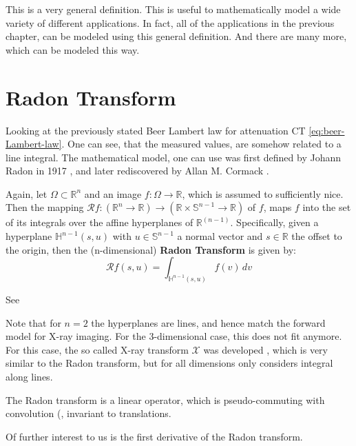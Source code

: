 This is a very general definition. This is useful to mathematically model a wide variety of
different applications. In fact, all of the applications in the previous chapter, can be modeled
using this general definition. And there are many more, which can be modeled this way.

\section{Radon Transform}

Looking at the previously stated Beer Lambert law for attenuation CT \autoref{eq:beer-Lambert-law}.
One can see, that the measured values, are somehow related to a line integral. The mathematical
model, one can use was first defined by Johann Radon in 1917 , and
later rediscovered by Allan M. Cormack .

\begin{definition}
	Again, let \(\Omega \subset \mathbb{R}^n\) and an image \(f\colon \Omega \to \mathbb{R}\),
	which is assumed to sufficiently nice. Then the mapping \(\mathscr{R}f\colon (\mathbb{R}^n
	\to \mathbb{R}) \to (\mathbb{R} \times \mathbb{S}^{n-1} \to \mathbb{R})\) of \(f\), maps
	\(f\) into the set of its integrals over the affine hyperplanes of \(\mathbb{R}^(n-1)\).
	Specifically, given a hyperplane \(\mathbb{H}^{n-1}(s, u)\) with \(u \in \mathbb{S}^{n-1}\)
	a normal vector and \(s \in \mathbb{R}\) the offset to the origin, then the (n-dimensional)
	\textbf{Radon Transform} is given by:
	\[ \mathscr{R}f(s, u) = \int_{\mathbb{H}^{n-1}(s, u)} f(v) \, dv \]

	See 
\end{definition}

Note that for \(n=2\) the hyperplanes are lines, and hence match the forward model for X-ray
imaging. For the 3-dimensional case, this does not fit anymore. For this case, the so called
X-ray transform \(\mathscr{X}\) was developed , which is
very similar to the Radon transform, but for all dimensions only considers integral along lines.

The Radon transform is a linear operator, which is pseudo-commuting with convolution (, invariant to
translations.  

Of further interest to us is the first derivative of the Radon transform.

